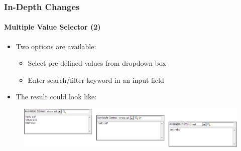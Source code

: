 \begin{frame}[fragile]
	\frametitle{In-Depth Changes}
	\framesubtitle{Multiple Value Selector (2)}

	\begin{itemize}
		\item Two options are available:

			\begin{itemize}
				\item Select pre-defined values from dropdown box
				\item Enter search/filter keyword in an input field
			\end{itemize}

		\item The result could look like:
	\end{itemize}

	\begin{figure}
		\includegraphics[width=1\linewidth]{Images/InDepthChanges/MultipleValueSelector.png}
	\end{figure}

\end{frame}


